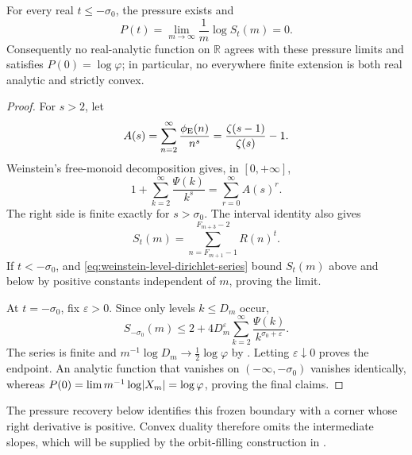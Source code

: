 \begin{proposition}
\label{prop:negative-temperature-freezing}
For every real \(t\le-\sigma_0\), the pressure exists and
\[
 P(t)=\lim_{m\to\infty}\frac1m\log S_t(m)=0.
\]
Consequently no real-analytic function on \(\mathbb R\) agrees with these
pressure limits and satisfies \(P(0)=\log\varphi\); in particular, no
everywhere finite extension is both real analytic and strictly convex.
\end{proposition}

\begin{proof}
For \(s>2\), let
\[
 A(s)=\sum_{n=2}^\infty\frac{\phi_{\rm E}(n)}{n^s}
 =\frac{\zeta(s-1)}{\zeta(s)}-1.
\]
Weinstein's free-monoid decomposition gives, in \([0,+\infty]\),
\begin{equation}
 1+\sum_{k=2}^\infty\frac{\Psi(k)}{k^s}
 =\sum_{r=0}^\infty A(s)^r.
 \label{eq:weinstein-level-dirichlet-series}
\end{equation}
The right side is finite exactly for \(s>\sigma_0\).  The interval identity
also gives
\begin{equation}
 S_t(m)=\sum_{n=F_{m+1}-1}^{F_{m+3}-2}R(n)^t.
 \label{eq:real-collision-two-layers}
\end{equation}
If \(t< -\sigma_0\),  and
\eqref{eq:weinstein-level-dirichlet-series} bound \(S_t(m)\) above and below
by positive constants independent of \(m\), proving the limit.

At \(t=-\sigma_0\), fix \(\varepsilon>0\).  Since only levels
\(k\le D_m\) occur,
\[
 S_{-\sigma_0}(m)
 \le2+4D_m^\varepsilon
 \sum_{k=2}^\infty\frac{\Psi(k)}{k^{\sigma_0+\varepsilon}}.
\]
The series is finite and
\(m^{-1}\log D_m\to\tfrac12\log\varphi\) by
.  Letting
\(\varepsilon\downarrow0\) proves the endpoint.  An analytic function that
vanishes on \(( -\infty,-\sigma_0)\) vanishes identically, whereas
\(P(0)=\lim m^{-1}\log\lvert X_m \rvert=\log\varphi\), proving the final claims.
\end{proof}

The pressure recovery below identifies this frozen boundary with a corner
whose right derivative is positive.  Convex duality therefore omits the
intermediate slopes, which will be supplied by the orbit-filling construction
in .
